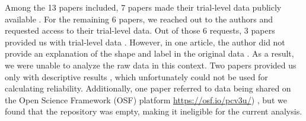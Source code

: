 \documentclass[sn-apa]{sn-jnl}%
\theoremstyle{thmstyleone}%
\theoremstyle{thmstyletwo}%
\theoremstyle{thmstylethree}%
\begin{document}
Among the 13 papers included, 7 papers made their trial-level data publicly available \parencite{constable2021affective,constable2020sticking,golubickis2021judging,navon2021are,qian2020prioritised,schafer2019understanding,svensson2022more}. For the remaining 6 papers, we reached out to the authors and requested access to their trial-level data. Out of those 6 requests, 3 papers provided us with trial-level data \parencite{kolvoort2020temporal,wozniak2018prioritization,xu2021romantic}. However, in one article, the author did not provide an explanation of the shape and label in the original data \parencite{kolvoort2020temporal}. As a result, we were unable to analyze the raw data in this context. Two papers provided us only with descriptive results \parencite{cheng2019saliency,martinez2020examining}, which unfortunately could not be used for calculating reliability. Additionally, one paper referred to data being shared on the Open Science Framework (OSF) platform \url{https://osf.io/pcv3u/}) \parencite{bukowski2021socio}, but we found that the repository was empty, making it ineligible for the current analysis. 
\end{document}
